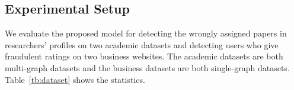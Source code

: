 \subsection{Experimental Setup}
We evaluate the proposed model for detecting the wrongly assigned papers in researchers' profiles on two academic datasets and detecting users who give fraudulent ratings on two business websites. The academic datasets are both multi-graph datasets and the business datasets are both single-graph datasets. Table~\ref{tb:dataset} shows the statistics.

